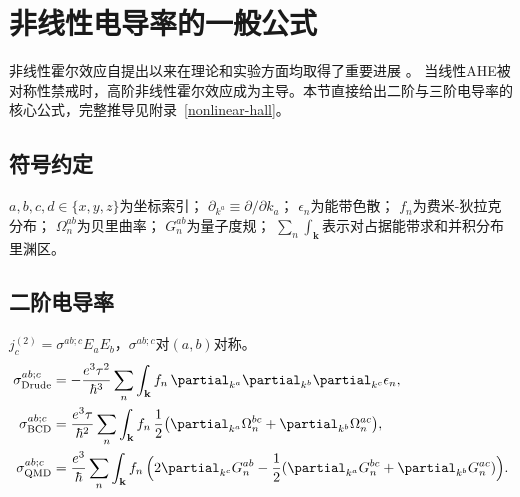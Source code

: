 \clearpage

\section{非线性电导率的一般公式}
\label{sec:nonlinear_formula}

非线性霍尔效应自提出以来在理论和实验方面均取得了重要进展
\cite{Sodemann2015,gao_field_2014,nandy_symmetry_2019,du_quantum_2021,du_nonlinear_2021,ma_observation_2019,kang_nonlinear_2019,wang_intrinsic_2021,ba_nonlinear_2023,min_colossal_2024,lai_third-order_2021,Zhang2023,gao_quantum_2023,yu_quantum_2025,liu_giant_2025,li_quantum_2024,Fang2024,chu_third-order_2025,chen_giant_2026,zhu_magnetic_2025}。
当线性AHE被对称性禁戒时，高阶非线性霍尔效应成为主导。本节直接给出二阶与三阶电导率的核心公式，完整推导见附录~\ref{nonlinear-hall}。

\subsection{符号约定}
$a,b,c,d\in\{x,y,z\}$为坐标索引； $\partial_{k^a}\equiv \partial/\partial k_a$； $\epsilon_n$为能带色散； $f_n$为费米-狄拉克分布； $\Omega_n^{ab}$为贝里曲率； $G_n^{ab}$为量子度规； $\sum_n\int_{\mathbf{k}}$表示对占据能带求和并积分布里渊区。

\subsection{二阶电导率}
$j_c^{(2)} = \sigma^{ab;c}E_a E_b$，$\sigma^{ab;c}$对$(a,b)$对称。
\begin{align}
\sigma_{\text{Drude}}^{ab;c} &= -\frac{e^3\tau^2}{\hbar^3}\sum_n\int_{\mathbf{k}} f_n\,\partial_{k^a}\partial_{k^b}\partial_{k^c}\epsilon_n, \label{eq:sigma2_Drude}\\
\sigma_{\text{BCD}}^{ab;c} &= \frac{e^3\tau}{\hbar^2}\sum_n\int_{\mathbf{k}} f_n\,
\frac{1}{2}\bigl(\partial_{k^a}\Omega_n^{bc}+\partial_{k^b}\Omega_n^{ac}\bigr), \label{eq:sigma2_BCD}\\
\sigma_{\text{QMD}}^{ab;c} &= \frac{e^3}{\hbar}\sum_n\int_{\mathbf{k}} f_n\,
\Bigl(2\partial_{k^c}G_n^{ab}-\frac{1}{2}(\partial_{k^a}G_n^{bc}+\partial_{k^b}G_n^{ac})\Bigr). \label{eq:sigma2_QMD}
\end{align}

